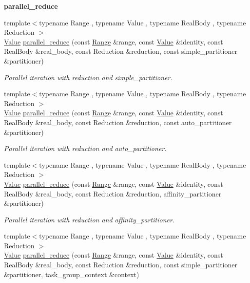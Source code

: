 \begin{Indent}{\bf parallel\+\_\+reduce}
\begin{DoxyCompactItemize}
{\footnotesize template$<$typename Range , typename Value , typename Real\+Body , typename Reduction $>$ }\\\hyperlink{structValue}{Value} \hyperlink{group__algorithms_ga0b22fd1de0e8bbaf46587d3c63a1ed93}{parallel\+\_\+reduce} (const \hyperlink{classtbb_1_1blocked__range}{Range} \&range, const \hyperlink{structValue}{Value} \&identity, const Real\+Body \&real\+\_\+body, const Reduction \&reduction, const simple\+\_\+partitioner \&partitioner)
\begin{DoxyCompactList}\small\item\em Parallel iteration with reduction and simple\+\_\+partitioner. \end{DoxyCompactList}\item 
{\footnotesize template$<$typename Range , typename Value , typename Real\+Body , typename Reduction $>$ }\\\hyperlink{structValue}{Value} \hyperlink{group__algorithms_ga56e6b6e2eee521f532c00d855280be69}{parallel\+\_\+reduce} (const \hyperlink{classtbb_1_1blocked__range}{Range} \&range, const \hyperlink{structValue}{Value} \&identity, const Real\+Body \&real\+\_\+body, const Reduction \&reduction, const auto\+\_\+partitioner \&partitioner)
\begin{DoxyCompactList}\small\item\em Parallel iteration with reduction and auto\+\_\+partitioner. \end{DoxyCompactList}\item 
{\footnotesize template$<$typename Range , typename Value , typename Real\+Body , typename Reduction $>$ }\\\hyperlink{structValue}{Value} \hyperlink{group__algorithms_gac26c35d1983e7ac2ab003cc8e49dd7e6}{parallel\+\_\+reduce} (const \hyperlink{classtbb_1_1blocked__range}{Range} \&range, const \hyperlink{structValue}{Value} \&identity, const Real\+Body \&real\+\_\+body, const Reduction \&reduction, affinity\+\_\+partitioner \&partitioner)
\begin{DoxyCompactList}\small\item\em Parallel iteration with reduction and affinity\+\_\+partitioner. \end{DoxyCompactList}\item 
{\footnotesize template$<$typename Range , typename Value , typename Real\+Body , typename Reduction $>$ }\\\hyperlink{structValue}{Value} \hyperlink{group__algorithms_ga518ef2653004d60319bdfc1c6bce86b6}{parallel\+\_\+reduce} (const \hyperlink{classtbb_1_1blocked__range}{Range} \&range, const \hyperlink{structValue}{Value} \&identity, const Real\+Body \&real\+\_\+body, const Reduction \&reduction, const simple\+\_\+partitioner \&partitioner, task\+\_\+group\+\_\+context \&context)

\end{DoxyCompactItemize}
\end{Indent}
